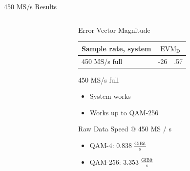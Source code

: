 \documentclass[10pt]{beamer}
\newcommand{\mc}[2]{\multicolumn{#1}{c|}{#2}}
\begin{document}
\begin{frame}{450 MS/s Results}
\begin{columns}[T]
\begin{column}{.5\textwidth}
    \end{column}
    \begin{column}{.5\textwidth}
      \begin{block}{Error Vector Magnitude}
        \begin{tabular}{|l|r@{}l|}
          \hline
          Sample rate, system             & \mc{2}{$\text{EVM}_\text{D}$} \\ \hline
          450 MS/s full                   & -26&.57      \\ \hline
        \end{tabular}
      \end{block}
      \begin{block}{450 MS/s full}
        \begin{itemize}
        \item System works
        \item Works up to QAM-256
        \end{itemize}
      \end{block}
      \begin{block}{Raw Data Speed @ 450 MS / s}
        \begin{itemize}
        \item QAM-4: $0.838 \;\frac{\text{GiBit}}{\text{s}}$ \\
        \item QAM-256: $3.353 \;\frac{\text{GiBit}}{\text{s}}$
        \end{itemize}
      \end{block}
    \end{column}
  \end{columns}
\end{frame}
\end{document}
